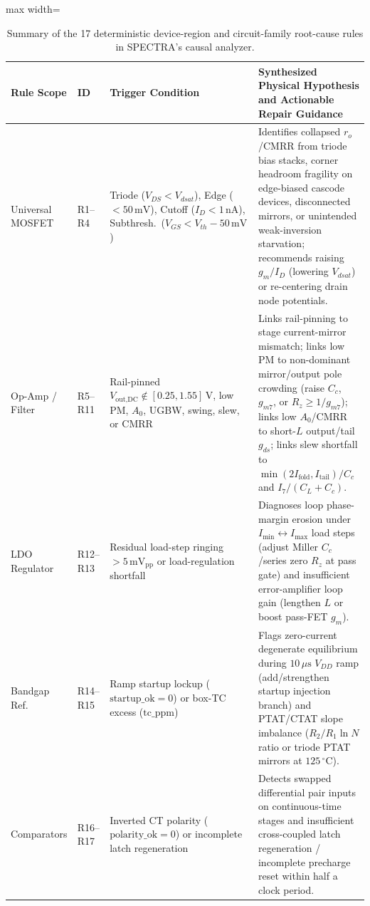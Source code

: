 \begin{table}[ht]
\centering
\caption{Summary of the 17 deterministic device-region and circuit-family root-cause rules in \textsc{SPECTRA}'s causal analyzer.}
\label{tab:supp_rules}
\footnotesize
\setlength{\tabcolsep}{4.0pt}
\begin{adjustbox}{max width=\textwidth}
\begin{tabular}{@{}lllp{86mm}@{}}
\toprule
Rule Scope & ID & Trigger Condition & Synthesized Physical Hypothesis and Actionable Repair Guidance \\
\midrule
Universal MOSFET & R1--R4 & Triode ($V_{DS} < V_{dsat}$), Edge ($<50\,\mathrm{mV}$), Cutoff ($I_D < 1\,\mathrm{nA}$), Subthresh.\ ($V_{GS} < V_{th}-50\,\mathrm{mV}$) & Identifies collapsed $r_o$/CMRR from triode bias stacks, corner headroom fragility on edge-biased cascode devices, disconnected mirrors, or unintended weak-inversion starvation; recommends raising $g_m/I_D$ (lowering $V_{dsat}$) or re-centering drain node potentials. \\
Op-Amp / Filter & R5--R11 & Rail-pinned $V_{\text{out,DC}} \notin [0.25, 1.55]\,\mathrm{V}$, low PM, $A_0$, UGBW, swing, slew, or CMRR & Links rail-pinning to stage current-mirror mismatch; links low PM to non-dominant mirror/output pole crowding (raise $C_c$, $g_{m7}$, or $R_z \ge 1/g_{m7}$); links low $A_0$/CMRR to short-$L$ output/tail $g_{ds}$; links slew shortfall to $\min(2I_{\text{fold}}, I_{\text{tail}})/C_c$ and $I_7/(C_L+C_c)$. \\
LDO Regulator & R12--R13 & Residual load-step ringing $>5\,\mathrm{mV}_{\text{pp}}$ or load-regulation shortfall & Diagnoses loop phase-margin erosion under $I_{\min} \leftrightarrow I_{\max}$ load steps (adjust Miller $C_c$/series zero $R_z$ at pass gate) and insufficient error-amplifier loop gain (lengthen $L$ or boost pass-FET $g_m$). \\
Bandgap Ref. & R14--R15 & Ramp startup lockup ($\text{startup\_ok}=0$) or box-TC excess ($\text{tc\_ppm}$) & Flags zero-current degenerate equilibrium during $10\,\mu\mathrm{s}$ $V_{DD}$ ramp (add/strengthen startup injection branch) and PTAT/CTAT slope imbalance ($R_2/R_1 \ln N$ ratio or triode PTAT mirrors at $125\,^\circ\mathrm{C}$). \\
Comparators & R16--R17 & Inverted CT polarity ($\text{polarity\_ok}=0$) or incomplete latch regeneration & Detects swapped differential pair inputs on continuous-time stages and insufficient cross-coupled latch regeneration / incomplete precharge reset within half a clock period. \\
\bottomrule
\end{tabular}
\end{adjustbox}
\end{table}

